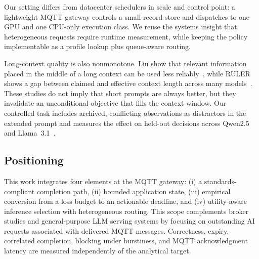 Our setting differs from datacenter schedulers in scale and control point: a lightweight MQTT gateway controls a small record store and dispatches to one GPU and one CPU-only execution class. We reuse the systems insight that heterogeneous requests require runtime measurement, while keeping the policy implementable as a profile lookup plus queue-aware routing.

Long-context quality is also nonmonotone. Liu \etal{} show that relevant information placed in the middle of a long context can be used less reliably~\cite{liu2024lost}, while RULER shows a gap between claimed and effective context length across many models~\cite{hsieh2024ruler}. These studies do not imply that short prompts are always better, but they invalidate an unconditional objective that fills the context window. Our controlled task includes archived, conflicting observations as distractors in the extended prompt and measures the effect on held-out decisions across Qwen2.5 and Llama~3.1~\cite{grattafiori2024llama3}.

\subsection{Positioning}

This work integrates four elements at the MQTT gateway: (i) a standards-compliant completion path, (ii) bounded application state, (iii) empirical conversion from a loss budget to an actionable deadline, and (iv) utility-aware inference selection with heterogeneous routing. This scope complements broker studies and general-purpose LLM serving systems by focusing on outstanding AI requests associated with delivered MQTT messages. Correctness, expiry, correlated completion, blocking under burstiness, and MQTT acknowledgment latency are measured independently of the analytical target.
